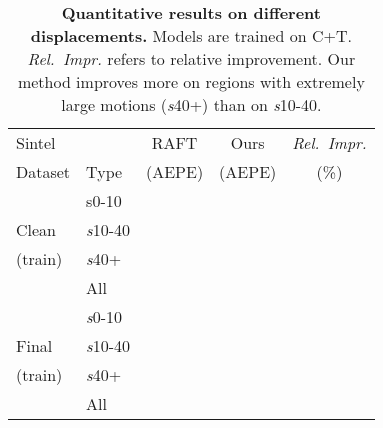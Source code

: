 \documentclass[10pt,twocolumn,letterpaper]{article}
\begin{document}
\begin{table}
  \setlength{\tabcolsep}{0.5\tabcolsep}
  \centering
\begin{tabular}{ll*{3}{c}}
\toprule
Sintel &  & RAFT\cite{teed2020raft} & Ours & \emph{Rel.~Impr.} \\
Dataset & Type & (AEPE) & (AEPE) & (\%)\\
\midrule
& s0-10 &  &  &   \\
Clean & \emph{s}10-40 &  &  &  \\
(train) & \emph{s}40+ &  &  &  \\
& All &  &  &  \\
\midrule
& \emph{s}0-10 &  &  &  \\
Final& \emph{s}10-40 &  &  &  \\
(train)& \emph{s}40+ &  &  &  \\
& All &  &  & \\
\bottomrule
\end{tabular}
\caption{{\bf Quantitative results on different displacements.} Models are trained on C+T. \emph{Rel.~Impr.} refers to relative improvement. Our method improves more on regions with extremely large motions (\emph{s}40+) than on \emph{s}10-40.}
  \label{tab:eval_displacement}
\end{table}
\end{document}

